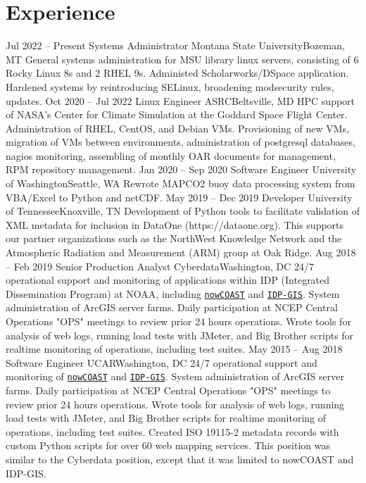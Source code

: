 \documentclass[11pt]{moderncv}  %
\begin{document}
\section{Experience}
\cventry
{Jul 2022 -- Present}
{Systems Administrator}
{Montana State University}{Bozeman, MT}{}
{
General systems administration for MSU library linux servers, consisting of 6 Rocky Linux 8s and 2 RHEL 9s.  Administed Scholarworks/DSpace application. Hardened systems by reintroducing SELinux, broadening modsecurity rules, updates.
}
\cventry
{Oct 2020 -- Jul 2022}
{Linux Engineer}
{ASRC}{Beltsville, MD}{}
{
HPC support of NASA's Center for Climate Simulation at the Goddard
Space Flight Center.  Administration of RHEL, CentOS, and Debian
VMs.  Provisioning of new VMs, migration of VMs between environments,
administration of postgresql databases, nagios monitoring, assembling
of monthly OAR documents for management, RPM repository management.
}
\cventry
{Jan 2020 -- Sep 2020}
{Software Engineer}
{University of Washington}{Seattle, WA}{}
{
    Rewrote MAPCO2 buoy data processing system from VBA/Excel to Python
    and netCDF.
}
\cventry
{May 2019 -- Dec 2019}
{Developer}
{University of Tennessee}{Knoxville, TN}{}
{
Development of Python tools to facilitate validation of XML metadata for inclusion in DataOne (https://dataone.org).  This supports our partner organizations such as the NorthWest Knowledge Network and the Atmospheric Radiation and Measurement (ARM) group at Oak Ridge.
}
\cventry
{Aug 2018 -- Feb 2019}
{Senior Production Analyst}
{Cyberdata}{Washington, DC}{}
{
24/7 operational support and monitoring of applications within IDP (Integrated Dissemination Program) at NOAA, including \href{https://nowcoast.noaa.gov}{\texttt{nowCOAST}} and \href{https://idpgis.ncep.noaa.gov}{\texttt{IDP-GIS}}.  System administration of ArcGIS server farms.  Daily participation at NCEP Central Operations "OPS" meetings to review prior 24 hours operations.  Wrote tools for analysis of web logs, running load tests with JMeter, and Big Brother scripts for realtime monitoring of operations, including test suites.  
}
\cventry
{May 2015 -- Aug 2018}
{Software Engineer}
{UCAR}{Washington, DC}{}
{
	24/7 operational support and monitoring of 
	\href{https://nowcoast.noaa.gov}{\texttt{nowCOAST}}
	and
	\href{https://idpgis.ncep.noaa.gov}{\texttt{IDP-GIS}}.
	System administration of ArcGIS server farms.  Daily
	participation at NCEP Central Operations "OPS" meetings to
	review prior 24 hours operations.  Wrote tools for analysis
	of web logs, running load tests with JMeter, and Big Brother
	scripts for realtime monitoring of operations, including
	test suites.  Created ISO 19115-2 metadata records with
	custom Python scripts for over 60 web mapping services.
	This position was similar to the Cyberdata position, except that
	it was limited to nowCOAST and IDP-GIS.
}
\end{document}
